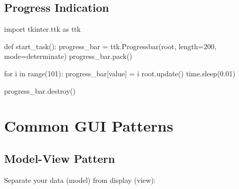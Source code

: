 \documentclass[
  letterpaper,
  DIV=11,
  numbers=noendperiod,
  oneside]{scrreprt}
\newenvironment{Shaded}{}{}
\newcommand{\BuiltInTok}[1]{\textcolor[rgb]{0.84,0.23,0.29}{#1}}
\newcommand{\ControlFlowTok}[1]{\textcolor[rgb]{0.84,0.23,0.29}{#1}}
\newcommand{\DecValTok}[1]{\textcolor[rgb]{0.00,0.36,0.77}{#1}}
\newcommand{\FloatTok}[1]{\textcolor[rgb]{0.00,0.36,0.77}{#1}}
\newcommand{\ImportTok}[1]{\textcolor[rgb]{0.01,0.18,0.38}{#1}}
\newcommand{\KeywordTok}[1]{\textcolor[rgb]{0.84,0.23,0.29}{#1}}
\newcommand{\NormalTok}[1]{\textcolor[rgb]{0.14,0.16,0.18}{#1}}
\newcommand{\OperatorTok}[1]{\textcolor[rgb]{0.14,0.16,0.18}{#1}}
\newcommand{\StringTok}[1]{\textcolor[rgb]{0.01,0.18,0.38}{#1}}
\begin{document}
\subsection{Progress Indication}\label{progress-indication}

\begin{Shaded}
\begin{Highlighting}[]
\ImportTok{import}\NormalTok{ tkinter.ttk }\ImportTok{as}\NormalTok{ ttk}

\KeywordTok{def}\NormalTok{ start\_task():}
\NormalTok{    progress\_bar }\OperatorTok{=}\NormalTok{ ttk.Progressbar(root, length}\OperatorTok{=}\DecValTok{200}\NormalTok{, mode}\OperatorTok{=}\StringTok{\textquotesingle{}determinate\textquotesingle{}}\NormalTok{)}
\NormalTok{    progress\_bar.pack()}
    
    \ControlFlowTok{for}\NormalTok{ i }\KeywordTok{in} \BuiltInTok{range}\NormalTok{(}\DecValTok{101}\NormalTok{):}
\NormalTok{        progress\_bar[}\StringTok{\textquotesingle{}value\textquotesingle{}}\NormalTok{] }\OperatorTok{=}\NormalTok{ i}
\NormalTok{        root.update()}
\NormalTok{        time.sleep(}\FloatTok{0.01}\NormalTok{)}
    
\NormalTok{    progress\_bar.destroy()}
\end{Highlighting}
\end{Shaded}

\section{Common GUI Patterns}\label{common-gui-patterns}

\subsection{Model-View Pattern}\label{model-view-pattern}

Separate your data (model) from display (view):
\end{document}
